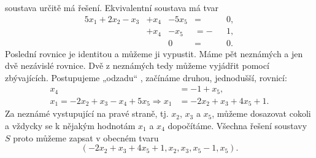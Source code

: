 \begin{example}
  soustava určitě má řešení. Ekvivalentní soustava má tvar
  \begin{alignat*}{5}
         x_1 + 2x_2 - x_3 &+  x_4 &- 5x_5 &=  &&0, \\
                          &+  x_4 &-  x_5 &= -&&1, \\
                          &       &     0 &=  &&0.
  \end{alignat*}
  Poslední rovnice je identitou a můžeme ji vypustit. Máme pět neznámých a jen dvě nezávislé 
  rovnice. Dvě z neznámých tedy můžeme vyjádřit pomocí zbývajících. Postupujeme „odzadu“ , začínáme 
  druhou, jednodušší, rovnicí:
  \begin{align*}
                                                x_4 &= -1 + x_5,                \\
    x_1 = - 2x_2 + x_3 - x_4 + 5x_5 \Rightarrow x_1 &= -2x_2 + x_3 + 4x_5 + 1.
  \end{align*}
  Za neznámé vystupující na pravé straně, tj. \(x_2\), \(x_3\) a \(x_5\), můžeme dosazovat cokoli a 
  vždycky se k nějakým hodnotám \(x_1\) a \(x_4\) dopočítáme. Všechna řešení soustavy \(S\) proto 
  můžeme zapsat v obecném tvaru
  \begin{equation}\label{mai:eq040}
    (-2x_2 + x_3 + 4x_5 + 1, x_2, x_3, x_5 - 1, x_5).
  \end{equation}
  \normalsize
\end{example}